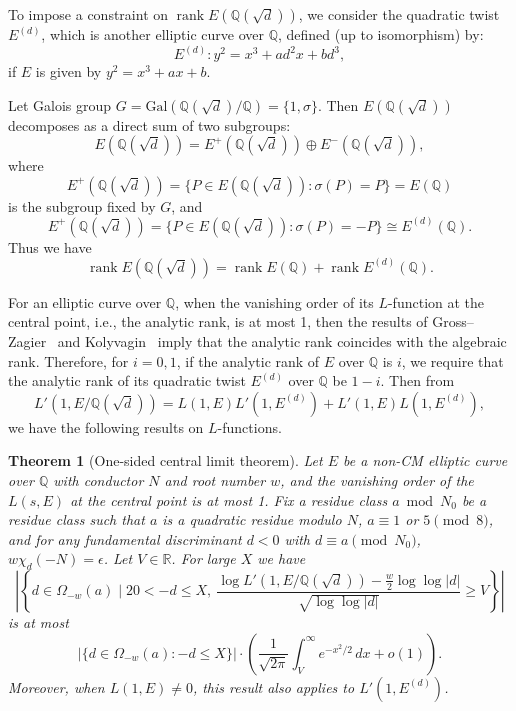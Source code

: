 \documentclass[12pt,reqno]{amsart}
\numberwithin{equation}{section}
\theoremstyle{plain}
\newtheorem{theorem}{Theorem}[section]
\theoremstyle{definition}
\theoremstyle{remark}
\newcommand{\rank}{\operatorname{rank}}
\begin{document}
To impose a constraint on $\rank E(\mathbb{Q}(\sqrt{d}))$, we consider the quadratic twist $E^{(d)}$, which is another elliptic curve over $\mathbb{Q}$, defined (up to isomorphism) by:
\[
E^{(d)}: y^2 = x^3 + a d^2 x + b d^3,
\]
if $E$ is given by $y^2 = x^3 + ax + b$.

Let Galois group \( G = \mathrm{Gal}(\mathbb{Q}(\sqrt{d})/\mathbb{Q}) = \{1, \sigma\} \).
Then $E(\mathbb{Q}(\sqrt{d}))$ decomposes as a direct sum of two subgroups:
\[
E(\mathbb{Q}(\sqrt{d})) = E^{+}(\mathbb{Q}(\sqrt{d})) \oplus E^{-}(\mathbb{Q}(\sqrt{d})),
\]
where
\[
E^{+}(\mathbb{Q}(\sqrt{d}))
= \{ P \in E(\mathbb{Q}(\sqrt{d})) : \sigma(P) = P \}
=E(\mathbb{Q})
\]
is the subgroup fixed by \( G \), and
\[
E^{+}(\mathbb{Q}(\sqrt{d}))
=\{ P \in E(\mathbb{Q}(\sqrt{d})) : \sigma(P) = -P \}
\cong E^{(d)}(\mathbb{Q}).
\]
Thus we have
\begin{equation*}
  \rank E(\mathbb{Q}(\sqrt{d}))=\rank E(\mathbb{Q})+\rank E^{(d)}(\mathbb{Q}).
\end{equation*}


For an elliptic curve over $\mathbb{Q}$, when the vanishing order of its $L$-function at the central point, i.e., the analytic rank, is at most 1, then the results of Gross--Zagier~\cite{GrossZagier1986} and Kolyvagin~\cite{Kolyvagin1990} imply that the analytic rank coincides with the algebraic rank.
Therefore, for \( i = 0, 1 \), if the analytic rank of \( E \) over \( \mathbb{Q} \) is \( i \), we require that the analytic rank of its quadratic twist \( E^{(d)} \) over \( \mathbb{Q} \) be \( 1 - i \).
Then from
\begin{equation}\label{eqn:L'EK}
  L'(1, E/\mathbb{Q}(\sqrt{d})) = L(1, E) L'(1, E^{(d)}) + L'(1, E) L(1, E^{(d)}),
\end{equation}
we have the following results on $L$-functions.

\begin{theorem}[One-sided central limit theorem]\label{thm:CLT-L}
Let \( E \) be a non-CM elliptic curve over \( \mathbb{Q} \) with conductor \( N \) and root number \( w \), and the vanishing order of the \(L(s,E)\) at the central point is at most 1.
Fix a residue class \( a \bmod N_0 \) be a residue class such that \( a \) is a quadratic residue modulo \( N \), \( a \equiv 1 \) or \( 5 \pmod{8} \),
and for any fundamental discriminant $d<0$ with $d\equiv a \pmod{N_0}$, $ w\chi_d(-N)=\epsilon$.
Let \( V \in \mathbb{R} \).
For large $X$ we have
\[
\left |\left\{
 d \in \Omega_{-w}(a)\mid 20 < -d \leq X,~
\frac{ \log L'(1, E/\mathbb{Q}(\sqrt{d})) - \tfrac{w}{2} \log \log |d| }{ \sqrt{ \log \log |d| } } \geq V
\right\}
\right |
\]
is at most
\[
\left| \{ d \in \Omega_{-w}(a) : -d \leq X \} \right| \cdot \left( \frac{1}{\sqrt{2\pi}} \int_V^{\infty} e^{-x^2/2} \, dx + o(1) \right).
\]
Moreover, when \(L(1,E)\neq 0\), this result also applies to \(L'(1, E^{(d)})\).
\end{theorem}
\end{document}
